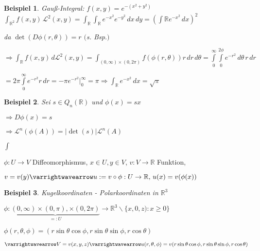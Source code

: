 \documentclass[11pt]{memoir}
\theoremstyle{changebreak}
\newtheorem{Beispiel}{Beispiel}[chapter]
\begin{document}
\begin{Beispiel}
\emph{Gauß-Integral}:
$f(x, y) = e^{-(x^2 + y^2)}$ \\
$\int_{\mathbb R^2} f(x, y) \, \mathscr L^2(x, y) = \int_\mathbb R \int_\mathbb R e^{-x^2} e^{-y^2} \, dx\, dy = \left(\int \mathbb R e^{-x^2} \, dx \right)^2$ 
\par
da $\det(D\phi(r, \theta)) = r$ $($s. Bsp.$)$ 
\par
$\Rightarrow \int_\mathbb R f(x, y) \, d\mathscr L^2(x,y) = \int_{(0, \infty) \times (0, 2\pi)} f(\phi(r, \theta))r \, dr\, d\theta = \int\limits_0^\infty \int\limits_0^{2\phi} e^{-r^2} \, d\theta\, r \, dr$
\par
$= 2\pi \int\limits_0^\infty e^{-r^2}r\, dr = -\pi e^{-r^2} |_0^\infty = \pi \Rightarrow \int_\mathbb R e^{-x^2} \, dx = \sqrt{\pi}$
\end{Beispiel}

\begin{Beispiel}
Sei $s \in Q_n(\mathbb R)$ und $\phi(x) = sx$ 
\par
$\Rightarrow D\phi(x) = s$ 
\par
$\Rightarrow \mathscr L^n(\phi(A)) = |\det(s)|\mathscr L^n(A)$ 
\par
$\int $
\end{Beispiel}

\par\bigskip
$\phi: U \rightarrow V$ Diffeomorphismus, $x \in U, y \in V$, $v: V \rightarrow \mathbb R$ Funktion, 
\par
$v = v(y) \varrightwavearrow u:= v \circ \phi: U \rightarrow \mathbb R, \, u(x) = v(\phi(x))$

\begin{Beispiel}
\emph{Kugelkoordinaten - Polarkoordinaten in $\mathbb R^3$} 
\par
$\phi: \underbrace{(0, \infty) \times (0, \pi), \times (0, 2\pi)}_{=: U} \rightarrow \mathbb R^3 \backslash \{x, 0, z): x \geq 0\}$ 
\par
$\phi(r, \theta, \phi) = (r \sin\theta\cos\phi, r\sin\theta\sin\phi, r\cos\theta)$ 
\par
$\varrightwavearrow V = v(x, y, z) \varrightwavearrow u(r, \theta, \phi) = v(r\sin\theta\cos\phi, r\sin\theta\sin\phi, r\cos\theta)$
\end{Beispiel}
\end{document}
